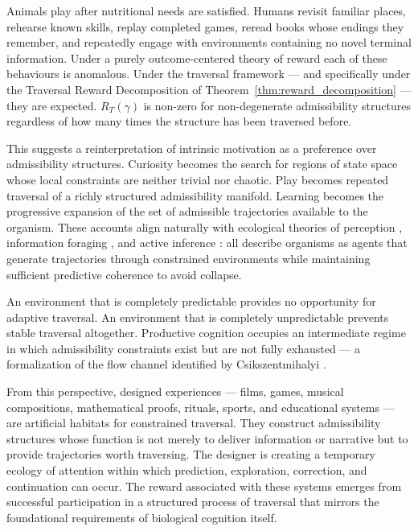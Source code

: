 \documentclass[12pt, a4paper]{article}
\theoremstyle{plain}
\theoremstyle{definition}
\theoremstyle{remark}
\newcommand{\traj}{\gamma}
\newcommand{\reward}{R}
\begin{document}
Animals play after nutritional needs are satisfied. Humans
revisit familiar places, rehearse known skills, replay
completed games, reread books whose endings they remember,
and repeatedly engage with environments containing no novel
terminal information. Under a purely outcome-centered theory
of reward each of these behaviours is anomalous. Under the
traversal framework --- and specifically under the Traversal
Reward Decomposition of Theorem~\ref{thm:reward_decomposition}
--- they are expected. $\reward_T(\traj)$ is non-zero for
non-degenerate admissibility structures regardless of how
many times the structure has been traversed before.

This suggests a reinterpretation of intrinsic motivation as
a preference over admissibility structures. Curiosity
becomes the search for regions of state space whose local
constraints are neither trivial nor chaotic. Play becomes
repeated traversal of a richly structured admissibility
manifold. Learning becomes the progressive expansion of the
set of admissible trajectories available to the organism.
These accounts align naturally with ecological theories of
perception \cite{gibson1979, noe2004}, information foraging
\cite{pirolli1999, pirolli2007}, and active inference
\cite{friston2010, parr2022}: all describe organisms as
agents that generate trajectories through constrained
environments while maintaining sufficient predictive
coherence to avoid collapse.

An environment that is completely predictable provides no
opportunity for adaptive traversal. An environment that is
completely unpredictable prevents stable traversal
altogether. Productive cognition occupies an intermediate
regime in which admissibility constraints exist but are not
fully exhausted --- a formalization of the flow channel
identified by Csikszentmihalyi \cite{csikszentmihalyi1990}.

From this perspective, designed experiences --- films,
games, musical compositions, mathematical proofs, rituals,
sports, and educational systems --- are artificial habitats
for constrained traversal. They construct admissibility
structures whose function is not merely to deliver
information or narrative but to provide trajectories worth
traversing. The designer is creating a temporary ecology of
attention within which prediction, exploration, correction,
and continuation can occur. The reward associated with these
systems emerges from successful participation in a
structured process of traversal that mirrors the
foundational requirements of biological cognition itself.
\end{document}
